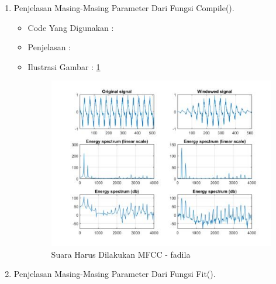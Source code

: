 \begin{enumerate}
\par
\par
\par
\par
\par
\par
\par
\par
\item Penjelasan Masing-Masing Parameter Dari Fungsi Compile().
\begin{itemize}
\item Code Yang Digunakan :
\par

\par
\item Penjelasan :
\par
\item Ilustrasi Gambar : \ref{suara-mfcc-fadila}
\par
\begin{figure}[!hbtp]
\centering
\includegraphics[scale=0.2]{figures/suara-mfcc-fadila.jpg}
\caption{Suara Harus Dilakukan MFCC - fadila}
\label{suara-mfcc-fadila}
\end{figure}
\par
\end{itemize}
\par
\par
\par
\par
\par
\par
\par
\par
\item Penjelasan Masing-Masing Parameter Dari Fungsi Fit().

\end{enumerate}
